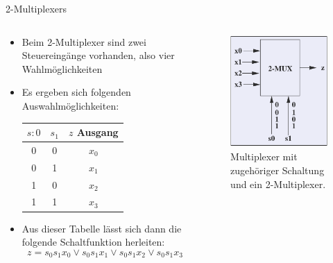 \documentclass[12pt%
,xcolor=table
,aspectratio=169%
]{beamer}
\begin{document}
\begin{frame}{2-Multiplexers}
\begin{columns}[T] %
\begin{column}{.68\textwidth}
\begin{itemize}
	\item Beim 2-Multiplexer sind zwei Steuereingänge vorhanden, also vier Wahlmöglichkeiten
	\item Es ergeben sich folgenden Auswahlmöglichkeiten:
\begin{table}[]
\begin{tabular}{|c|c|c|}
\hline
 \textbf{$s:0$}& \textbf{$s_1$}  & \textbf{$z$ Ausgang}  \\ \hline
0 & 0 & $x_0$  \\ \hline
0 & 1  & $x_1$ \\ \hline
1 & 0  & $x_2$ \\ \hline
1 & 1  & $x_3$ \\ \hline
\end{tabular}
\end{table}
	\item Aus dieser Tabelle lässt sich dann die folgende Schaltfunktion herleiten:
	$$ z = s_0 s_1 x_0 \lor s_0 s_1 x_1 \lor s_0 s_1 x_2 \lor s_0 s_1 x_3 $$
\end{itemize}
\end{column}%
\hfill%
\begin{column}{.48\textwidth}
\centering
\begin{figure}
\includegraphics[scale=0.32]{pictures/mux2}
\caption{Multiplexer mit zugehöriger Schaltung und ein 2-Multiplexer.}
\end{figure}
\end{column}%
\end{columns}
\end{frame}
\end{document}
